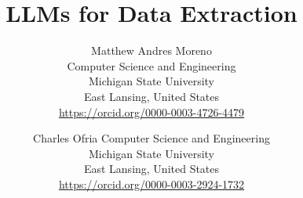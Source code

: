 \title{ LLMs for Data Extraction }

\author{
Matthew Andres Moreno\\
Computer Science and Engineering \\
Michigan State University\\
East Lansing, United States \\
\url{https://orcid.org/0000-0003-4726-4479} \\
\and
Charles Ofria
Computer Science and Engineering \\
Michigan State University\\
East Lansing, United States \\
\url{https://orcid.org/0000-0003-2924-1732}
}

\maketitle
